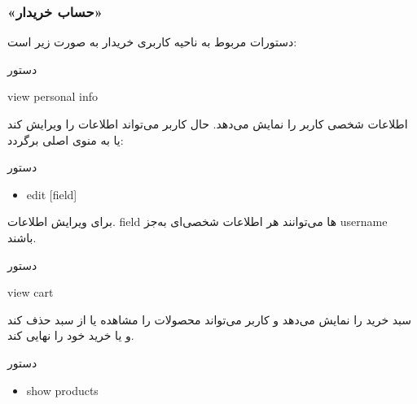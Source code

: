 \documentclass[]{article}
\begin{document}
\newpage

\subsubsection*{{\titr «حساب خریدار»}}

دستورات مربوط به ناحیه کاربری خریدار به صورت زیر است:


\begin{mybox}[colback=yellow]{دستور}

\begin{latin}

view personal info

\end{latin}

\end{mybox}

اطلاعات شخصی کاربر را نمایش می‌دهد. حال کاربر می‌تواند اطلاعات را ویرایش کند یا به منوی اصلی برگردد:

\begin{mybox}[colback=brilliantlavender]{دستور}

\begin{latin}

\begin{itemize}[label = {$\Rightarrow$}]

\item
edit [field] 

\end{itemize}

\end{latin}

\end{mybox}

برای ویرایش اطلاعات. field ها می‌توانند هر اطلاعات شخصی‌ای به‌جز username باشند.

\hrulefill

\begin{mybox}[colback=yellow]{دستور}

\begin{latin}

view cart

\end{latin}

\end{mybox}

سبد خرید را نمایش می‌دهد و کاربر می‌تواند محصولات را مشاهده یا از سبد حذف کند و یا خرید خود را نهایی کند.


\begin{mybox}[colback=brilliantlavender]{دستور}

\begin{latin}

\begin{itemize}[label = {$\Rightarrow$}]

\item
show products

\end{itemize}

\end{latin}

\end{mybox}
\end{document}
